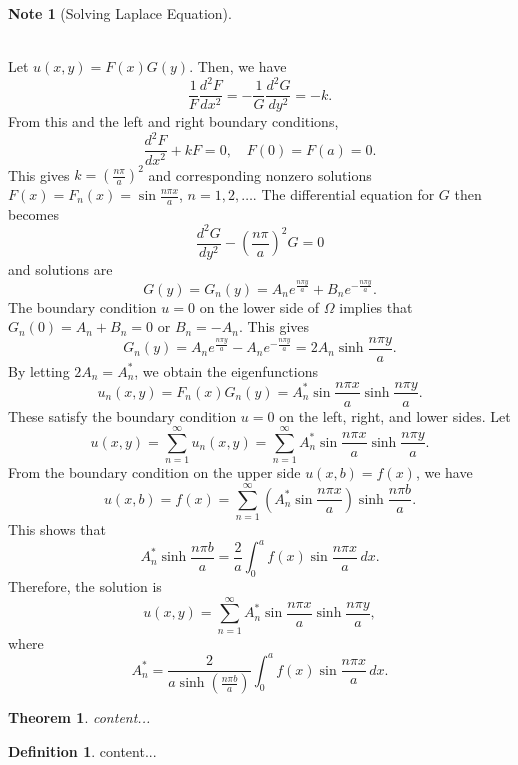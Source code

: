 \documentclass[12pt,openany]{book}
\newtheorem{theorem}{Theorem}[chapter]
\theoremstyle{definition}
\newtheorem{definition}{Definition}[chapter]
\newtheorem*{note}{Note}
\begin{document}
\begin{note}[Solving Laplace Equation]
\begin{figure}[h!]
		\end{figure}\\
		Let \( u(x, y) = F(x)G(y) \). Then, we have \[
		\frac{1}{F} \frac{d^2 F}{dx^2} = -\frac{1}{G} \frac{d^2 G}{dy^2} = -k.
		\] From this and the left and right boundary conditions,
		\[
		\frac{d^2 F}{dx^2} + kF = 0, \quad F(0) = F(a) = 0.
		\] This gives \( k = \left( \frac{n\pi}{a} \right)^2 \) and corresponding nonzero solutions \( F(x) = F_n(x) = \sin \frac{n\pi x}{a} \), \( n = 1,2,\ldots \). The differential equation for \( G \) then becomes
		\[
		\frac{d^2 G}{dy^2} - \left( \frac{n\pi}{a} \right)^2 G = 0
		\]
		and solutions are
		\[
		G(y) = G_n(y) = A_n e^{\frac{n\pi y}{a}} + B_n e^{-\frac{n\pi y}{a}}.
		\]
		The boundary condition \( u = 0 \) on the lower side of \( \Omega \) implies that \( G_n(0) = A_n + B_n = 0 \) or \( B_n = -A_n \). This gives
		\[
		G_n(y) = A_n e^{\frac{n\pi y}{a}} - A_n e^{-\frac{n\pi y}{a}} = 2A_n \sinh \frac{n\pi y}{a}.
		\]
		By letting \( 2A_n = A_n^* \), we obtain the eigenfunctions
		\[
		u_n(x, y) = F_n(x)G_n(y) = A_n^* \sin \frac{n\pi x}{a} \sinh \frac{n\pi y}{a}.
		\]
		These satisfy the boundary condition \( u = 0 \) on the left, right, and lower sides.
		Let
		\[
		u(x, y) = \sum_{n=1}^{\infty} u_n(x, y) = \sum_{n=1}^{\infty} A_n^* \sin \frac{n\pi x}{a} \sinh \frac{n\pi y}{a}.
		\] From the boundary condition on the upper side \( u(x, b) = f(x) \), we have
		\[
		u(x, b) = f(x) = \sum_{n=1}^{\infty} \left( A_n^* \sin \frac{n\pi x}{a} \right) \sinh \frac{n\pi b}{a}.
		\] This shows that
		\[
		A_n^* \sinh \frac{n\pi b}{a} = \frac{2}{a} \int_{0}^{a} f(x) \sin \frac{n\pi x}{a} \, dx.
		\] Therefore, the solution is
		\[
		u(x, y) = \sum_{n=1}^{\infty} A_n^* \sin \frac{n\pi x}{a} \sinh \frac{n\pi y}{a},
		\]
		where
		\[
		A_n^* = \frac{2}{a \sinh \left( \frac{n\pi b}{a} \right)} \int_{0}^{a} f(x) \sin \frac{n\pi x}{a} \, dx.
		\]
	\end{note}
	\newpage
	\begin{tcolorbox}[colframe=thmcolor, title={\color{white}\bf Fourier Cosine and Since Series}]
		\begin{theorem}
			content...
		\end{theorem}
	\end{tcolorbox}
	\begin{tcolorbox}[colframe=defcolor, title={\color{white}\bf Fourier Cosine and Since Series}]
		\begin{definition}
			content...
		\end{definition}
	\end{tcolorbox}
	
	
	
\end{document}
